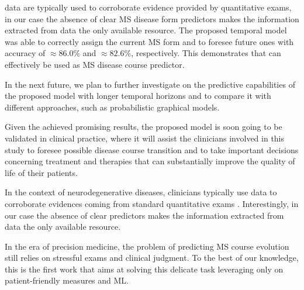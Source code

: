 \PCOs data are typically used to corroborate evidence provided by quantitative exams, in our case the absence of clear MS disease form predictors makes the information extracted from \PCOs data the only available resource.
The proposed temporal model was able to correctly assign the current MS form and to foresee future ones with accuracy of $\approx 86.0\%$ and $\approx 82.6\%$, respectively.
This demonstrates that \PCOs can effectively be used as MS disease course predictor.

In the next future, we plan to further investigate on the predictive capabilities of the proposed model with longer temporal horizons and to compare it with different approaches, such as probabilistic graphical models.

Given the achieved promising results, the proposed model is soon going to be validated in clinical practice, where it will assist the clinicians involved in this study to foresee possible disease course transition and to take important decisions concerning treatment and therapies that can substantially improve the quality of life of their patients.

In the context of neurodegenerative diseases, clinicians typically use \PCOs data to corroborate evidences coming from standard quantitative exams \cite{black2013patient}. Interestingly, in our case the absence of clear \SP predictors makes the information extracted from \PCOs data the only available resource.

In the era of precision medicine, the problem of predicting MS course evolution still relies on stressful exams and clinical judgment.
To the best of our knowledge, this is the first work that aims at solving this delicate task leveraging only on patient-friendly measures and ML.